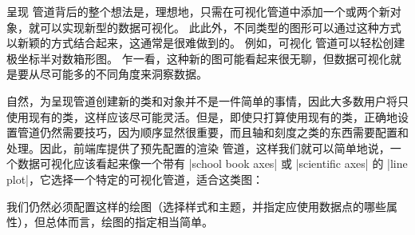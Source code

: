 呈现 管道背后的整个想法是，理想地，只需在可视化管道中添加一个或两个新对象，就可以实现新型的数据可视化。 此此外，不同类型的图形可以通过这种方式以新颖的方式结合起来，这通常是很难做到的。 例如，可视化 管道可以轻松创建极坐标半对数箱形图。 乍一看，这种新的图可能看起来很无聊，但数据可视化就是要从尽可能多的不同角度来洞察数据。


自然，为呈现管道创建新的类和对象并不是一件简单的事情，因此大多数用户将只使用现有的类，这样应该尽可能灵活。但是，即使只打算使用现有的类，正确地设置管道仍然需要技巧，因为顺序显然很重要，而且轴和刻度之类的东西需要配置和处理。因此，前端库提供了预先配置的渲染 管道，这样我们就可以简单地说，一个数据可视化应该看起来像一个带有 |school book axes| 或 |scientific axes| 的 |line plot|，它选择一个特定的可视化管道，适合这类图：

%
\begin{codeexample}[preamble={\usetikzlibrary{datavisualization.formats.functions}}]
\end{codeexample}
%
\begin{codeexample}[preamble={\usetikzlibrary{datavisualization.formats.functions}}]
\end{codeexample}
%

我们仍然必须配置这样的绘图（选择样式和主题，并指定应使用数据点的哪些属性），但总体而言，绘图的指定相当简单。



